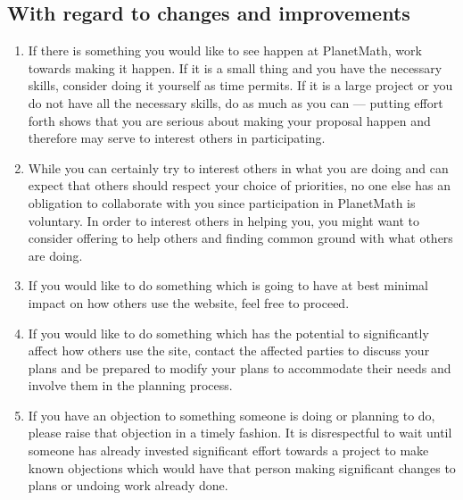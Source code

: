 \subsection{With regard to changes and improvements}
\begin{enumerate}
\item If there is something you would like to see happen at PlanetMath, work
towards making it happen. If it is a small thing and you have the
necessary skills, consider doing it yourself as time permits. If it
is a large project or you do not have all the necessary skills, do as
much as you can --- putting effort forth shows that you are serious
about making your proposal happen and therefore may serve to
interest others in participating.
\item While you can certainly try to interest others in what you are doing
and can expect that others should respect your choice of priorities,
no one else has an obligation to collaborate with you since
participation in PlanetMath is voluntary. In order to interest
others in helping you, you might want to consider offering to help
others and finding common ground with what others are doing.
\item If you would like to do something which is going to have at best
minimal impact on how others use the website, feel free to proceed.
\item If you would like to do something which has the potential to
significantly affect how others use the site, contact the affected
parties to discuss your plans and be prepared to modify your plans to
accommodate their needs and involve them in the planning process.
\item If you have an objection to something someone is doing or planning
to do, please raise that objection in a timely fashion. It is
disrespectful to wait until someone has already invested significant
effort towards a project to make known objections which would
have that person making significant changes to plans or undoing work
already done.
\end{enumerate}

